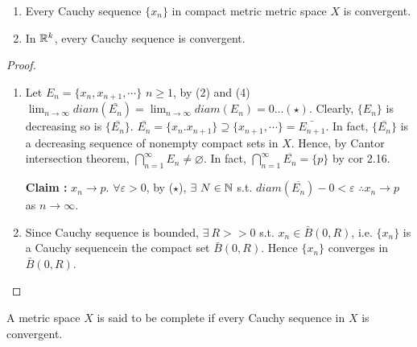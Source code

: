 	\begin{thm}$ $
 		
	\begin{enumerate}
			
		\item Every Cauchy sequence $\{x_n\}$ in compact metric metric space $X$ is convergent.
		\item In $\mathbb{R}^k$, every Cauchy sequence is convergent.  
	
	\end{enumerate}
	\end{thm}
	\begin{proof}$ $

		\begin{enumerate}
		\item Let $E_n = \{x_n,x_{n+1},\cdots\}$ $n\geq 1$, by (2) and (4) $\lim_{n\to \infty} diam(\bar{E_n}) = \lim_{n\to\infty} diam(E_n) = 0\ldots (\star)$. Clearly, $\{E_n\}$ is decreasing so is $\{\bar{E_n}\}$. $\bar{E_n} = \{x_n.x_{n+1}\} \supseteq \{x_{n+1},\cdots\} = \bar{E_{n+1}}$. In fact, $\{\bar{E_n}\}$ is a decreasing sequence of nonempty compact sets in $X$. Hence, by Cantor intersection theorem, $\bigcap_{n=1}^{\infty} E_n \neq \varnothing$. In fact, $\bigcap_{n=1}^{\infty}\overline{E_n} = \{p\}$ by cor 2.16.
			
			\textbf{Claim :} $x_n \to p$. $\forall \varepsilon > 0$, by ($\star$), $\exists\ N\in \mathbb{N} $ s.t. $diam(\overline{E_n}) - 0 < \varepsilon$ $\therefore x_n \to p $ as $n\to \infty$.
		\item Since Cauchy sequence is bounded, $\exists\ R >>0$ s.t. $x_n\in\bar{B}(0,R)$, i.e. $\{x_n\}$ is a Cauchy sequencein the compact set $\bar{B}(0,R)$. Hence $\{x_n\}$ converges in $\bar{B}(0,R)$. 
		\end{enumerate}
	\end{proof}

	\begin{defn}
		A metric space $X$ is said to be complete if every Cauchy sequence in $X$ is convergent.
	\end{defn}
	
